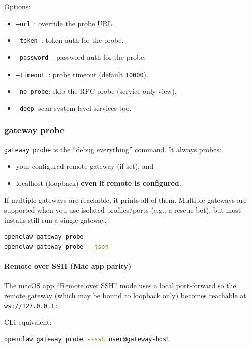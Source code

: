Options:

\begin{itemize}
  \item \texttt{--url }: override the probe URL.
  \item \texttt{--token }: token auth for the probe.
  \item \texttt{--password }: password auth for the probe.
  \item \texttt{--timeout }: probe timeout (default \texttt{10000}).
  \item \texttt{--no-probe}: skip the RPC probe (service-only view).
  \item \texttt{--deep}: scan system-level services too.
\end{itemize}


\subsubsection{gateway probe}


\texttt{gateway probe} is the “debug everything” command. It always probes:

\begin{itemize}
  \item your configured remote gateway (if set), and
  \item localhost (loopback) \textbf{even if remote is configured}.
\end{itemize}


If multiple gateways are reachable, it prints all of them. Multiple gateways are supported when you use isolated profiles/ports (e.g., a rescue bot), but most installs still run a single gateway.

\begin{lstlisting}[language=bash]
openclaw gateway probe
openclaw gateway probe --json
\end{lstlisting}


\paragraph{Remote over SSH (Mac app parity)}


The macOS app “Remote over SSH” mode uses a local port-forward so the remote gateway (which may be bound to loopback only) becomes reachable at \texttt{ws://127.0.0.1:}.

CLI equivalent:

\begin{lstlisting}[language=bash]
openclaw gateway probe --ssh user@gateway-host
\end{lstlisting}


